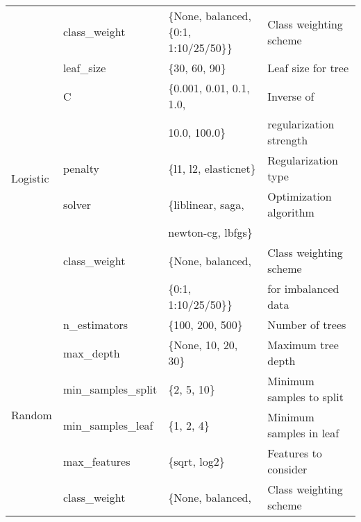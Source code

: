 \documentclass{article}
\begin{document}
\begin{table}[htbp]
\begin{tabular}{llll}
                                    & class\_weight           & \{None, balanced, \{0:1, 1:10/25/50\}\}        & Class weighting scheme   \\
                                    & leaf\_size              & \{30, 60, 90\}                                 & Leaf size for tree       \\
        \midrule
        \multirow{6}{*}{Logistic}   & C                       & \{0.001, 0.01, 0.1, 1.0,                       & Inverse of               \\
        \multirow{6}{*}{Regression} &                         & 10.0, 100.0\}                                  & regularization strength  \\
                                    & penalty                 & \{l1, l2, elasticnet\}                         & Regularization type      \\
                                    & solver                  & \{liblinear, saga,                             & Optimization algorithm   \\
                                    &                         & newton-cg, lbfgs\}                             &                          \\
                                    & class\_weight           & \{None, balanced,                              & Class weighting scheme   \\
                                    &                         & \{0:1, 1:10/25/50\}\}                          & for imbalanced data      \\
        \midrule
        \multirow{6}{*}{Random}     & n\_estimators           & \{100, 200, 500\}                              & Number of trees          \\
        \multirow{6}{*}{Forest}     & max\_depth              & \{None, 10, 20, 30\}                           & Maximum tree depth       \\
                                    & min\_samples\_split     & \{2, 5, 10\}                                   & Minimum samples to split \\
                                    & min\_samples\_leaf      & \{1, 2, 4\}                                    & Minimum samples in leaf  \\
                                    & max\_features           & \{sqrt, log2\}                                 & Features to consider     \\
                                    & class\_weight           & \{None, balanced,                              & Class weighting scheme   \\

\end{tabular}
\end{table}
\end{document}
